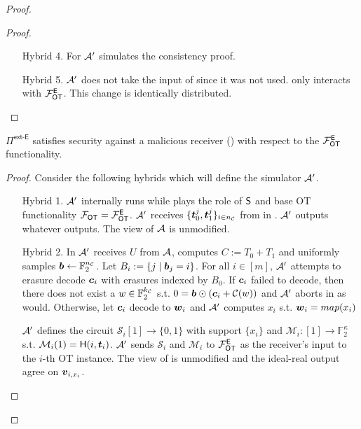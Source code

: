 \begin{proof}
\begin{proof}
\begin{enumerate}[leftmargin=0.6cm,itemindent=30pt]
			\item[Hybrid 4.] For  $\mathcal{A}'$ simulates the consistency proof.
			
			\item[Hybrid 5.] $\mathcal{A}'$ does not take the input of \rec since it was not used. \rec only interacts with $\mathcal{F}_{\mathsf{OT}}^\mathsf{E}$. This change is identically distributed.
		\end{enumerate}
		\pe
	\end{proof}

	\begin{claim}\label{claim:ext-E-MalReceiver}
	$\Pi^\textsf{ext-E}$ satisfies security against a malicious receiver () with respect to the $\mathcal{F}_{\mathsf{OT}}^\mathsf{E}$ functionality.
	\end{claim}
	\begin{proof}
				Consider the following hybrids which will define the simulator $\mathcal{A}'$. 
		\begin{enumerate}[leftmargin=0.6cm,itemindent=30pt]
			\item[Hybrid 1.] $\mathcal{A}'$ internally runs \Adv while plays the role of $\mathsf{S}$ and base OT functionality $\mathcal{F}_{\mathsf{OT}}=\mathcal{F}_{\mathsf{OT}}^\mathsf{E}$. $\mathcal{A}'$ receives $\{\boldsymbol{t}^j_0,\boldsymbol{t}^j_1\}_{i\in{n_\mathcal{C}}}$ from \Adv in . $\mathcal{A}'$ outputs whatever \Adv outputs. The view of $\mathcal{A}$ is unmodified.
			
			\item[Hybrid 2.] In  $\mathcal{A}'$ receives $U$ from $\mathcal{A}$, computes $C:=T_0+T_1$ and uniformly samples $\boldsymbol{b}\gets\mathbb{F}^{{n_\mathcal{C}}}_2$. Let  $B_i:=\{j \mid \boldsymbol{b}_j = i\}$. For all $i\in[m]$, $\mathcal{A}'$ attempts to erasure decode $\boldsymbol{c}_i$ with erasures indexed by $B_0$. If $\boldsymbol{c}_i$ failed to decode, then there does not exist a $w\in\mathbb{F}^{{k_\mathcal{C}}}_2$ s.t. $0=\boldsymbol{b}\odot (\boldsymbol{c}_i+\mathcal{C}(w))$ and $\mathcal{A}'$ aborts in  as \send would. Otherwise, let $\boldsymbol{c}_i$ decode to $\boldsymbol{w}_i$ and $\mathcal{A}'$ computes $x_i$ s.t. $\boldsymbol{w}_i=map(x_i)$
			
			
			$\mathcal{A}'$ defines the circuit $\mathcal{S}_i[1]\rightarrow\{0,1\}$ with support $\{x_i\}$ and $\mathcal{M}_i:[1]\rightarrow\mathbb{F}^\kappa_2$ s.t. $\mathcal{M}_i(1)=\mathsf{H}(i, \boldsymbol{t}_i)$. $\mathcal{A}'$ sends $\mathcal{S}_i$ and $\mathcal{M}_i$ to $\mathcal{F}_{\mathsf{OT}}^\mathsf{E}$ as the receiver's input to the $i$-th OT instance. The view of \Adv is unmodified and the ideal-real output agree on $\boldsymbol{v}_{i,x_i}$.
			

\end{enumerate}
\end{proof}
\end{proof}
